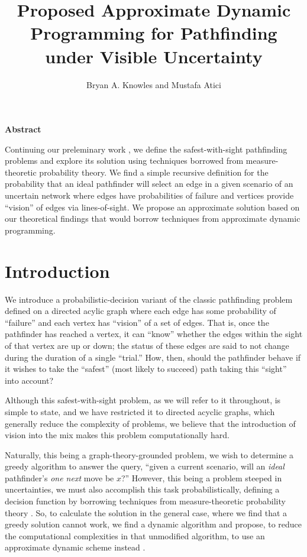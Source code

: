 \documentclass{article}
\title{Proposed Approximate Dynamic Programming for Pathfinding under Visible Uncertainty}
\author{Bryan A. Knowles and Mustafa Atici}
\begin{document}
    
    
    \maketitle
    
    

    
    \textbf{Abstract}

    Continuing our preleminary work \cite{knowles14}, we define the
safest-with-sight pathfinding problems and explore its solution using
techniques borrowed from measure-theoretic probability theory. We find a
simple recursive definition for the probability that an ideal pathfinder
will select an edge in a given scenario of an uncertain network where
edges have probabilities of failure and vertices provide ``vision'' of
edges via lines-of-sight. We propose an approximate solution based on
our theoretical findings that would borrow techniques from approximate
dynamic programming.

    \section{Introduction}\label{introduction}

    We introduce a probabilistic-decision variant of the classic pathfinding
problem defined on a directed acylic graph \cite{wilson80} where each
edge has some probability of ``failure'' and each vertex has ``vision''
of a set of edges. That is, once the pathfinder has reached a vertex, it
can ``know'' whether the edges within the sight of that vertex are up or
down; the status of these edges are said to not change during the
duration of a single ``trial.'' How, then, should the pathfinder behave
if it wishes to take the ``safest'' (most likely to succeed) path taking
this ``sight'' into account?

Although this safest-with-sight problem, as we will refer to it
throughout, is simple to state, and we have restricted it to directed
acyclic graphs, which generally reduce the complexity of problems, we
believe that the introduction of vision into the mix makes this problem
computationally hard.

Naturally, this being a graph-theory-grounded problem, we wish to
determine a greedy algorithm \cite{wilson80} to answer the query,
``given a current scenario, will an \emph{ideal} pathfinder's \emph{one
next} move be $x$?'' However, this being a problem steeped in
uncertainties, we must also accomplish this task probabilistically,
defining a decision function by borrowing techniques from
measure-theoretic probability theory \cite{pollard01}. So, to calculate
the solution in the general case, where we find that a greedy solution
cannot work, we find a dynamic algorithm and propose, to reduce the
computational complexities in that unmodified algorithm, to use an
approximate dynamic scheme instead \cite{powell11}.
\end{document}

